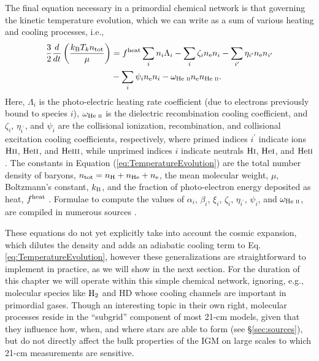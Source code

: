 The final equation necessary in a primordial chemical network is that governing the kinetic temperature evolution, which we can write as a sum of various heating and cooling processes, i.e.,
\begin{align}
    \frac{3}{2}\frac{d}{dt}\left(\frac{k_{\text{B}} T_k n_{\text{tot}}}{\mu}\right) & = f^{\text{heat}}  \sum_i n_i \Lambda_i - \sum_i \zeta_i n_{\text{e}} n_i - \sum_{i^{\prime}} \eta_{i^{\prime}} n_{\text{e}} n_{i^{\prime}} \nonumber \\ & - \sum_i \psi_i n_{\text{e}} n_i - \omega_{\text{He } \textsc{ii}} n_{\text{e}} n_{\text{He } \textsc{ii}} \label{eq:TemperatureEvolution} .
\end{align}
Here, $\Lambda_i$ is the photo-electric heating rate coefficient (due to
electrons previously bound to species $i$), $\omega_{\text{He } \textsc{ii}}$ is the dielectric
recombination cooling coefficient, and $\zeta_i$, $\eta_{i^{\prime}}$, and
$\psi_i$ are the collisional ionization, recombination, and collisional
excitation cooling coefficients, respectively, where primed indices
$i^{\prime}$ indicate ions $\text{H} {\textsc{ii}}$, $\text{He} {\textsc{ii}}$, and $\text{He} {\textsc{iii}}$, while unprimed
indices $i$ indicate neutrals $\text{H} {\textsc{i}}$, $\text{He} {\textsc{i}}$, and $\text{He} {\textsc{ii}}$. The constants in
Equation (\ref{eq:TemperatureEvolution}) are the total number density of
baryons, $n_{\text{tot}} = n_\mathrm{H} + n_{\mathrm{He}} + n_{\text{e}}$, the mean molecular
weight, $\mu$, Boltzmann's constant, $k_{\text{B}}$, and the fraction of photo-electron energy deposited as heat, $f^{\text{heat}}$ \cite{Shull1985,Furlanetto2010}. Formulae to compute the values of
$\alpha_i$, $\beta_i$, $\xi_i$, $\zeta_i$, $\eta_{i^{\prime}}$, $\psi_i$, and
$\omega_{\text{He } \textsc{ii}}$, are compiled in {\color{red} numerous sources \cite{Fukugita1994}.}

These equations do not yet explicitly take into account the cosmic expansion, which dilutes the density and adds an adiabatic cooling term to Eq. \ref{eq:TemperatureEvolution}, however these generalizations are straightforward to implement in practice, as we will show in the next section. For the duration of this chapter we will operate within this simple chemical network, ignoring, e.g., molecular species like $\text{H}_2$ and $\mathrm{HD}$ whose cooling channels are important in primordial gases. Though an interesting topic in their own right, molecular processes reside in the ``subgrid'' component of most 21-cm models, given that they influence how, when, and where stars are able to form (see \S\ref{sec:sources}), but do not directly affect the bulk properties of the IGM on large scales to which 21-cm measurements are sensitive. 

